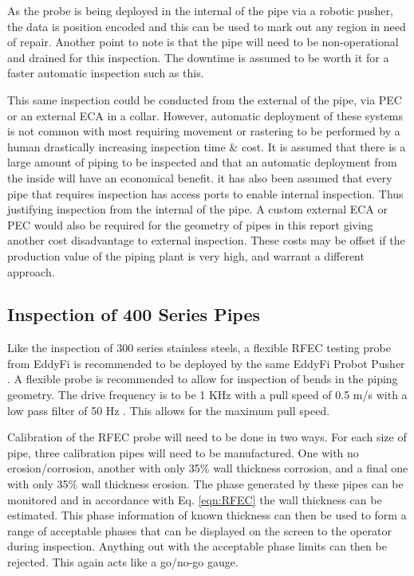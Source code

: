 \documentclass[a4paper,twoside,11pt]{article}
\begin{document}
As the probe is being deployed in the internal of the pipe via a robotic pusher, the data is position encoded and this can be used to mark out any region in need of repair. 
Another point to note is that the pipe will need to be non-operational and drained for this inspection. The downtime is assumed to be worth it for a faster automatic inspection such as this.

This same inspection could be conducted from the external of the pipe, via PEC or an external ECA in a collar. 
However, automatic deployment of these systems is not common with most requiring movement or rastering to be performed by a human drastically increasing inspection time \& cost.
It is assumed that there is a large amount of piping to be inspected and that an automatic deployment from the inside will have an economical benefit. it has also been assumed that every pipe that requires inspection has access ports to enable internal inspection. Thus justifying inspection from the internal of the pipe.
A custom external ECA or PEC would also be required for the geometry of pipes in this report giving another cost disadvantage to external inspection.
These costs may be offset if the production value of the piping plant is very high, and warrant a different approach.
		
\subsection{Inspection of 400 Series Pipes} 

Like the inspection of 300 series stainless steels, a flexible RFEC testing probe from EddyFi \cite{eddyfiEddyfitubingprobecatalog201810Pdf} is recommended to be deployed by the same EddyFi Probot Pusher \cite{eddyfiProbotHighPerformanceProbe}. 
A flexible probe is recommended to allow for inspection of bends in the piping geometry. The drive frequency is to be 1 KHz with a pull speed of 0.5 m/s with a low pass filter of 50 Hz \cite{eddyfiMaximizingRemoteFieldTesting2019}. This allows for the maximum pull speed. 

Calibration of the RFEC probe will need to be done in two ways. 
For each size of pipe, three calibration pipes will need to be manufactured. 
One with no erosion/corrosion, another with only 35\% wall thickness corrosion, and a final one with only 35\% wall thickness erosion.
The phase generated by these pipes can be monitored and in accordance with Eq. \ref{eqn:RFEC} the wall thickness can be estimated. 
This phase information of known thickness can then be used to form a range of acceptable phases that can be displayed on the screen to the operator during inspection. 
Anything out with the acceptable phase limits can then be rejected. This again acts like a go/no-go gauge.
\end{document}
